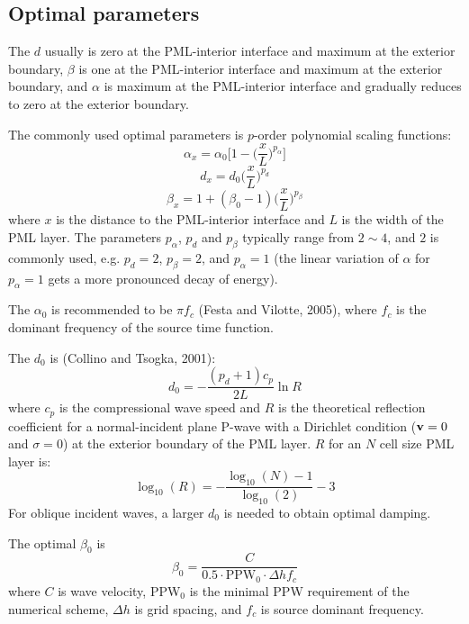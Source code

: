 \subsection{Optimal parameters}
The $d$ usually is zero at the PML-interior interface and maximum at the exterior boundary, $\beta$ is one at the PML-interior interface and maximum at the exterior boundary, and $\alpha$ is maximum at the PML-interior interface and gradually reduces to zero at the exterior boundary.\par
The commonly used optimal parameters is $p$-order polynomial scaling functions:
\[ \alpha_x=\alpha_0\Big[1-\Big(\frac{x}{L}\Big)^{p_\alpha}\Big] \]
\[ d_x=d_0\Big(\frac{x}{L}\Big)^{p_d} \]
\[ \beta_x=1+(\beta_0-1)\Big(\frac{x}{L}\Big)^{p_\beta} \]
where $x$ is the distance to the PML-interior interface and $L$ is the width of the PML layer. The parameters $p_\alpha$, $p_d$ and $p_\beta$ typically range from $2\sim4$, and $2$ is commonly used, e.g. $p_d=2$, $p_\beta=2$, and $p_\alpha=1$ (the linear variation of $\alpha$ for $p_\alpha=1$ gets a more pronounced decay of energy).\par
The $\alpha_0$ is recommended to be $\pi f_c$ (Festa and Vilotte, 2005), where $f_c$ is the dominant frequency of the source time function.\par
The $d_0$ is (Collino and Tsogka, 2001):
\[ d_0=-\frac{(p_d+1)c_p}{2L}\ln R \]
where $c_p$ is the compressional wave speed and $R$ is the theoretical reflection coefficient for a normal-incident plane P-wave with a Dirichlet condition ($\mathbf{v}=0$ and $\sigma=0$) at the exterior boundary of the PML layer. $R$ for an $N$ cell size PML layer is:
\[ \log_{10}(R)=-\frac{\log_{10}(N)-1}{\log_{10}(2)}-3 \]
For oblique incident waves, a larger $d_0$ is needed to obtain optimal damping.\par
The optimal $\beta_0$ is
\[ \beta_0=\frac{C}{0.5\cdot \mathrm{PPW}_0\cdot\Delta hf_c} \]
where $C$ is wave velocity, PPW$_0$ is the minimal PPW requirement of the numerical scheme, $\Delta h$ is grid spacing, and $f_c$ is source dominant frequency.\par

